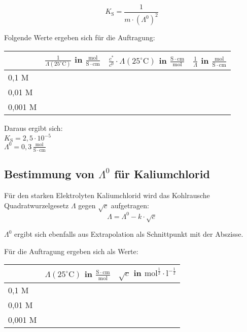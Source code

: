 \documentclass[12pt,a4paper,titlepage,headinclude,bibtotoc]{scrartcl}
\begin{document}
\begin{equation}
K_{\mathrm{S}} = \frac{1}{m \cdot (\Lambda^0)^2}
\end{equation}

Folgende Werte ergeben sich für die Auftragung:\\

\begin{table} [h]
\centering 
\begin{tabular}{|p{4cm}||p{4cm}|p{4cm}|p{4cm}|}
\hline
& $\frac{1}{\Lambda(25^\circ\text{C})}$ in $\frac{\mathrm{mol}}{\mathrm{S} \cdot \mathrm{cm}}$ & $\frac{c^*}{c^0} \cdot \Lambda(25^\circ\text{C})$ in $\frac{\mathrm{S} \cdot \mathrm{cm}}{\mathrm{mol}}$ & $\frac{1}{\Lambda}$ in $\frac{\mathrm{mol}}{\mathrm{S} \cdot \mathrm{cm}}$\\
\hline
0,1 M & & & \\
\hline
0,01 M & & & \\
\hline
0,001 M & & & \\
\hline
\end{tabular}
\end{table}

Daraus ergibt sich:\\

$K_{\mathrm{S}} = 2,5 \cdot 10^{-5}$\\
$\Lambda^0 = 0,3\, \frac{\mathrm{mol}}{\mathrm{S} \cdot \mathrm{cm}}$\\





\subsection{Bestimmung von $\Lambda^0$ für Kaliumchlorid}

Für den starken Elektrolyten Kaliumchlorid wird das Kohlrausche Quadratwurzelgesetz $\Lambda$ gegen $\sqrt{c}$ aufgetragen:\\

\begin{equation}
\Lambda = \Lambda^0 - k \cdot \sqrt{c}
\end{equation}

$\Lambda^0$ ergibt sich ebenfalls aus Extrapolation als Schnittpunkt mit der Abszisse.

Für die Auftragung ergeben sich als Werte:\\


\begin{table} [h]
\centering 
\begin{tabular}{|p{4cm}||p{4cm}|p{4cm}|}
\hline
& $\Lambda(25^\circ\text{C})$ in $\frac{\mathrm{S} \cdot \mathrm{cm}}{\mathrm{mol}}$ & $\sqrt{c}$ in $\mathrm{mol^{\frac{1}{2}}} \cdot \mathrm{l^{- \frac{1}{2}}}$\\
\hline
0,1 M & &  \\
\hline
0,01 M & &  \\
\hline
0,001 M & &  \\
\hline
\end{tabular}
\end{table}
\end{document}
